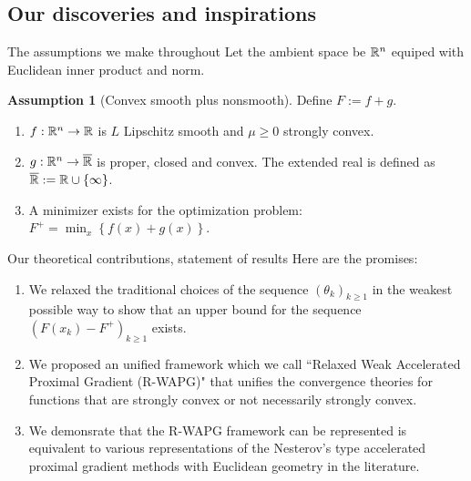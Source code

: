 \documentclass[11pt]{beamer}
\theoremstyle{definition}
\newtheorem{assumption}{Assumption}[section]
\begin{document}
    \subsection{Our discoveries and inspirations}
        \begin{frame}{The assumptions we make throughout}
            Let the ambient space be $\mathbb R^n$ equiped with Euclidean inner product and norm. 
            \begin{assumption}[Convex smooth plus nonsmooth]
                Define $F := f + g$.
                \begin{enumerate}
                    \item $f: \mathbb R^n \rightarrow \mathbb R$ is $L$ Lipschitz smooth and $\mu \ge 0$ strongly convex.
                    \item $g: \mathbb R^n \rightarrow \overline {\mathbb R}$ is proper, closed and convex. The extended real is defined as $\overline {\mathbb R} := \mathbb R \cup \{\infty\}$.
                    \item A minimizer exists for the optimization problem: $F^+ = \min_x \left\lbrace f(x) + g(x)\right\rbrace$.
                \end{enumerate}
            \end{assumption}
        \end{frame}
        \begin{frame}{Our theoretical contributions, statement of results}
            Here are the promises: 
            \begin{enumerate}
                \item We relaxed the traditional choices of the sequence $(\theta_k)_{k \ge 1}$ in the weakest possible way to show that an upper bound for the sequence $(F(x_k) - F^+)_{k \ge 1}$ exists. 
                \item We proposed an unified framework which we call ``Relaxed Weak Accelerated Proximal Gradient (R-WAPG)" that unifies the convergence theories for functions that are strongly convex or not necessarily strongly convex. 
                \item We demonsrate that the R-WAPG framework can be represented is equivalent to various representations of the Nesterov's type accelerated proximal gradient methods with Euclidean geometry in the literature. 
            \end{enumerate}
             
        \end{frame}
\end{document}

